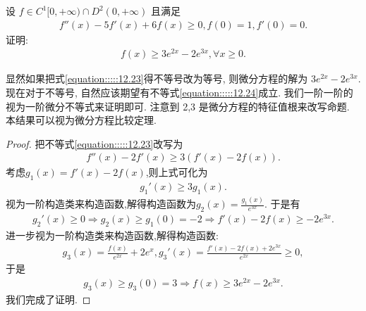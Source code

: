 \documentclass[../../main.tex]{subfiles}%
\begin{document}
\begin{example}
设 $f\in C^1[0,+\infty)\cap D^2(0,+\infty)$ 且满足
\begin{align}
f''(x)-5f'(x)+6f(x)\geqslant0,f(0)=1,f'(0)=0.
\label{equation:::::12.23}
\end{align}
证明:
\begin{align}
f(x)\geqslant3e^{2x}-2e^{3x},\forall x\geqslant0.
\label{equation:::::12.24}
\end{align}
\end{example}
\begin{note}
显然如果把式\eqref{equation:::::12.23}得不等号改为等号, 则微分方程的解为 $3e^{2x}-2e^{3x}$. 现在对于不等号, 自然应该期望有不等式\eqref{equation:::::12.24}成立. 我们一阶一阶的视为一阶微分不等式来证明即可. 注意到 2,3 是微分方程的特征值根来改写命题. 本结果可以视为微分方程比较定理.
\end{note}
\begin{proof}

把不等式\eqref{equation:::::12.23}改写为
\begin{align*}
f''(x)-2f'(x)\geqslant3(f'(x)-2f(x)).
\end{align*}
考虑$g_1(x)=f'(x)-2f(x)$,则上式可化为
\begin{align*}
g_1'(x)\geqslant 3g_1(x).
\end{align*}
视为一阶构造类来构造函数,解得构造函数为$g_2(x)=\frac{g_1(x)}{e^{3x}}$.
于是有
\begin{align*}
g_2'(x)\geqslant0\Rightarrow g_2(x)\geqslant g_1(0)=-2\Rightarrow f'(x)-2f(x)\geqslant -2e^{3x}.
\end{align*}
进一步视为一阶构造类来构造函数,解得构造函数:
\begin{align*}
g_3(x)=\frac{f(x)}{e^{2x}}+2e^{x},g_3'(x)=\frac{f'(x)-2f(x)+2e^{3x}}{e^{2x}}\geqslant0,
\end{align*}
于是
\begin{align*}
g_3(x)\geqslant g_3(0)=3\Rightarrow f(x)\geqslant3e^{2x}-2e^{3x}.
\end{align*}
我们完成了证明. 

\end{proof}
\end{document}
